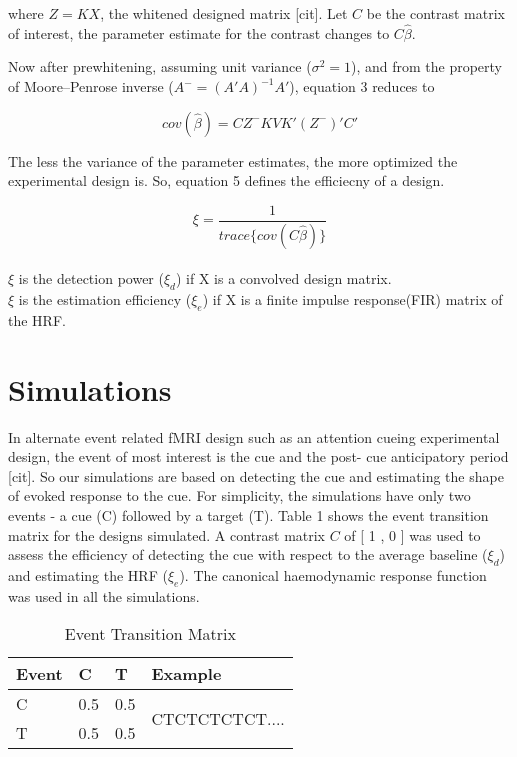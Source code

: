 \documentclass[11pt]{article}
\begin{document}
where \(Z = KX\), the whitened designed matrix [cit]. Let $C$ be the contrast matrix of interest, the parameter estimate for the contrast changes to \(C\hat{\beta}\).\par

Now after prewhitening, assuming unit variance (\(\sigma^2 = 1\)), and from the property of Moore–Penrose inverse (\(A^-=(A'A)^{-1}A'\)), equation 3 reduces to

\begin{equation}
    cov(\hat{\beta}) = CZ^-KVK'(Z^-)'C'
\end{equation}

The less the variance of the parameter estimates, the more optimized the experimental design is. So, equation 5 defines the efficiecny of a design.

\begin{equation}
    \xi = \frac{1} {trace\{cov(C\hat{\beta})\}}
\end{equation}
\\
\(\xi\) is the detection power (\(\xi_d\)) if X is a convolved design matrix.\\
\(\xi\) is the estimation efficiency (\(\xi_e\)) if X is a finite impulse response(FIR) matrix of the HRF.


\section{Simulations}
In alternate event related fMRI design such as an attention cueing experimental design, the event of most interest is the cue and the post- cue anticipatory period [cit]. So our simulations are based on detecting the cue and estimating the shape of evoked response to the cue. For simplicity, the simulations have only two events - a cue (C) followed by a target (T). Table 1 shows the event transition matrix for the designs simulated. A contrast matrix $C$ of [ 1 , 0 ] was used to assess the efficiency of detecting the cue with respect to the average baseline (\(\xi_d\)) and estimating the HRF (\(\xi_e\)). The canonical haemodynamic response function was used in all the simulations.



\begin{table}[t]
\centering
\caption{Event Transition Matrix}
\begin{tabular}{llll} 
\hline
Event & C   & T   & Example                          \\ 
\hline
C     & 0.5 & 0.5 & \multirow{2}{*}{CTCTCTCTCT....}  \\
T     & 0.5 & 0.5 &                                  \\
\hline
\end{tabular}
\end{table}
\end{document}
